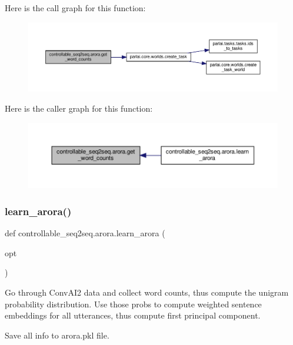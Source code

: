 Here is the call graph for this function\+:
\nopagebreak
\begin{figure}[H]
\begin{center}
\leavevmode
\includegraphics[width=350pt]{namespacecontrollable__seq2seq_1_1arora_aa75b304fb4087b1a9134d05f4bb6b3a7_cgraph}
\end{center}
\end{figure}
Here is the caller graph for this function\+:
\nopagebreak
\begin{figure}[H]
\begin{center}
\leavevmode
\includegraphics[width=350pt]{namespacecontrollable__seq2seq_1_1arora_aa75b304fb4087b1a9134d05f4bb6b3a7_icgraph}
\end{center}
\end{figure}
\mbox{\label{namespacecontrollable__seq2seq_1_1arora_a02fe047a44dcee074e6157300bd61001}} 
\subsubsection{\texorpdfstring{learn\+\_\+arora()}{learn\_arora()}}
{\footnotesize\ttfamily def controllable\+\_\+seq2seq.\+arora.\+learn\+\_\+arora (\begin{DoxyParamCaption}\item[{}]{opt }\end{DoxyParamCaption})}

\begin{DoxyVerb}Go through ConvAI2 data and collect word counts, thus compute the unigram
probability distribution. Use those probs to compute weighted sentence embeddings
for all utterances, thus compute first principal component.

Save all info to arora.pkl file.
\end{DoxyVerb}
 

